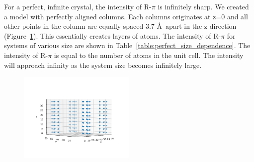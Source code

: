 \documentclass{article}
\begin{document}
  For a perfect, infinite crystal, the intensity of R-$\pi$ is infinitely sharp. We
  created a model with perfectly aligned columns. Each columns originates at z=0
  and all other points in the column are equally spaced 3.7 \AA~apart in the
  z-direction (Figure~\ref{fig:perfect_crystal_xyz}). This essentially creates
  layers of atoms. The intensity of R-$\pi$ for systems of various size are shown
  in Table~\ref{table:perfect_size_dependence}. The intensity of R-$\pi$ is equal
  to the number of atoms in the unit cell. The intensity will approach infinity as
  the system size becomes infinitely large.  

  \begin{figure}[!htb]
  \centering
  \includegraphics[width=0.5\textwidth]{perfect_crystal_xyz.png}
  \caption{}\label{fig:perfect_crystal_xyz}
  \end{figure}
\end{document}
